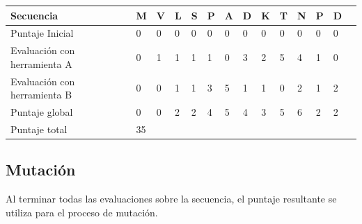 \vspace{0.3cm}
\begin{tabular}{llllllllllllll} 
\hline
Secuencia & \textbf{M} & \textbf{V} & \textbf{L} & \textbf{S} & \textbf{P} & \textbf{A} & \textbf{D} & \textbf{K} & \textbf{T} & \textbf{N} & \textbf{P} & \textbf{D} \\ \hline
Puntaje Inicial & 0 & 0 & 0 & 0 & 0 & 0 & 0 & 0 & 0 & 0 & 0 & 0\\ \hline
Evaluación con herramienta A & 0 & 1 & 1 & 1 & 1 & 0 & 3 & 2 & 5 & 4 & 1 & 0\\ \hline
Evaluación con herramienta B & 0 & 0 & 1 & 1 & 3 & 5 & 1 & 1 & 0 & 2 & 1 & 2\\ \hline
Puntaje global & 0 & 0 & 2 & 2 & 4 & 5 & 4 & 3 & 5 & 6 & 2 & 2\\ \hline
Puntaje total  & 35 \\ \hline
\end{tabular}

\vspace{0.5cm}



\subsection{Mutación}\label{mutacion}

Al terminar todas las evaluaciones sobre la secuencia, el puntaje resultante se utiliza para el proceso de mutación.




